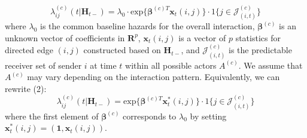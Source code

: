 \documentclass[a4paper]{article}
\begin{document}
\begin{equation}
\lambda^{(c)}_{ij}(t|\boldsymbol{H}_{t-})=\lambda_0\cdot \mbox{exp}\Big\{\boldsymbol{\beta}^{(c)T}\boldsymbol{x}_t(i, j)\Big\}\cdot 1\{j \in \mathcal{J}^{(c)}_{(i, t)}\}
\end{equation}
where $\lambda_0$ is the common baseline hazards for the overall interaction, $\boldsymbol{\beta}^{(c)}$ is an unknown vector of coefficients in $\boldsymbol{R}^{p}$, $\boldsymbol{x}_t(i, j)$ is a vector of $p$ statistics for directed edge $(i, j)$ constructed based on
$\boldsymbol{H}_{t-}$, and $\mathcal{J}^{(c)}_{(i, t)}$ is the predictable receiver set of sender $i$ at time $t$ within all possible actors $A^{(c)}$. We assume that $A^{(c)}$ may vary depending on the interaction pattern. Equivalently, we can rewrite (2): 
\begin{equation}
\lambda^{(c)}_{ij}(t|\boldsymbol{H}_{t-})= \mbox{exp}\Big\{\boldsymbol{\beta}^{(c)T}\boldsymbol{x}^*_t(i, j)\Big\}\cdot 1\{j \in \mathcal{J}^{(c)}_{(i, t)}\}
\end{equation}
where the first element of $\boldsymbol{\beta}^{(c)}$ corresponds to $\lambda_0$ by setting $\boldsymbol{x}^*_t(i, j)=(\boldsymbol{1}, \boldsymbol{x}_t(i, j))$.
\end{document}
